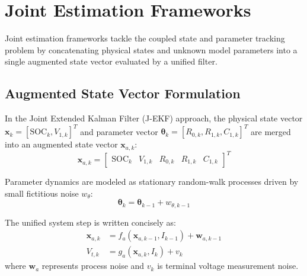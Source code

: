\section{Joint Estimation Frameworks}
\label{sec:joint_estimation_frameworks}

Joint estimation frameworks tackle the coupled state and parameter tracking problem by concatenating physical states and unknown model parameters into a single augmented state vector evaluated by a unified filter.

\subsection{Augmented State Vector Formulation}
In the Joint Extended Kalman Filter (J-EKF) approach, the physical state vector $\mathbf{x}_k = [\text{SOC}_k, V_{1,k}]^T$ and parameter vector $\boldsymbol{\theta}_k = [R_{0,k}, R_{1,k}, C_{1,k}]^T$ are merged into an augmented state vector $\mathbf{x}_{a,k}$:
\begin{equation}
\mathbf{x}_{a,k} = \begin{bmatrix} \text{SOC}_k & V_{1,k} & R_{0,k} & R_{1,k} & C_{1,k} \end{bmatrix}^T
\label{eq:ch7_augmented_vector_def}
\end{equation}

Parameter dynamics are modeled as stationary random-walk processes driven by small fictitious noise $w_{\theta}$:
\begin{equation}
\boldsymbol{\theta}_k = \boldsymbol{\theta}_{k-1} + w_{\theta, k-1}
\label{eq:ch7_random_walk_params}
\end{equation}

The unified system step is written concisely as:
\begin{align}
\mathbf{x}_{a,k} &= f_a(\mathbf{x}_{a,k-1}, I_{k-1}) + \mathbf{w}_{a,k-1} \\
V_{t,k} &= g_a(\mathbf{x}_{a,k}, I_k) + v_k
\end{align}
where $\mathbf{w}_{a}$ represents process noise and $v_k$ is terminal voltage measurement noise.



